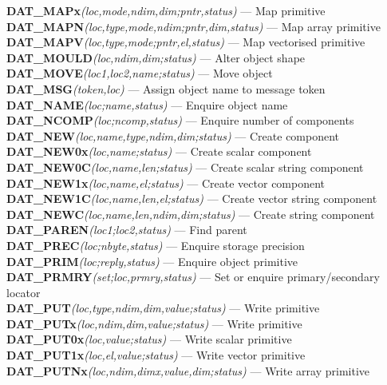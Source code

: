 {\bf DAT\_MAPx}{\em (loc,mode,ndim,dim;pntr,status)} --- Map primitive \\
{\bf DAT\_MAPN}{\em (loc,type,mode,ndim;pntr,dim,status)} --- Map array primitive\\
{\bf DAT\_MAPV}{\em (loc,type,mode;pntr,el,status)} --- Map vectorised primitive\\
{\bf DAT\_MOULD}{\em (loc,ndim,dim;status)} --- Alter object shape \\
{\bf DAT\_MOVE}{\em (loc1,loc2,name;status)} --- Move object \\
{\bf DAT\_MSG}{\em (token,loc)} --- Assign object name to message token \\
{\bf DAT\_NAME}{\em (loc;name,status)} --- Enquire object name \\
{\bf DAT\_NCOMP}{\em (loc;ncomp,status)} --- Enquire number of components \\
{\bf DAT\_NEW}{\em (loc,name,type,ndim,dim;status)} --- Create component \\
{\bf DAT\_NEW0x}{\em (loc,name;status)} --- Create scalar component\\
{\bf DAT\_NEW0C}{\em (loc,name,len;status)} --- Create scalar string component\\
{\bf DAT\_NEW1x}{\em (loc,name,el;status)} --- Create vector component\\
{\bf DAT\_NEW1C}{\em (loc,name,len,el;status)} --- Create vector string component\\
{\bf DAT\_NEWC}{\em (loc,name,len,ndim,dim;status)} --- Create string component\\
{\bf DAT\_PAREN}{\em (loc1;loc2,status)} --- Find parent \\
{\bf DAT\_PREC}{\em (loc;nbyte,status)} --- Enquire storage precision\\
{\bf DAT\_PRIM}{\em (loc;reply,status)} --- Enquire object primitive \\
{\bf DAT\_PRMRY}{\em (set;loc,prmry,status)} --- Set or enquire
primary/secondary locator \\
{\bf DAT\_PUT}{\em (loc,type,ndim,dim,value;status)} --- Write primitive \\
{\bf DAT\_PUTx}{\em (loc,ndim,dim,value;status)} --- Write primitive \\
{\bf DAT\_PUT0x}{\em (loc,value;status)} --- Write scalar primitive\\
{\bf DAT\_PUT1x}{\em (loc,el,value;status)} --- Write vector primitive\\
{\bf DAT\_PUTNx}{\em (loc,ndim,dimx,value,dim;status)} --- Write array primitive\\
